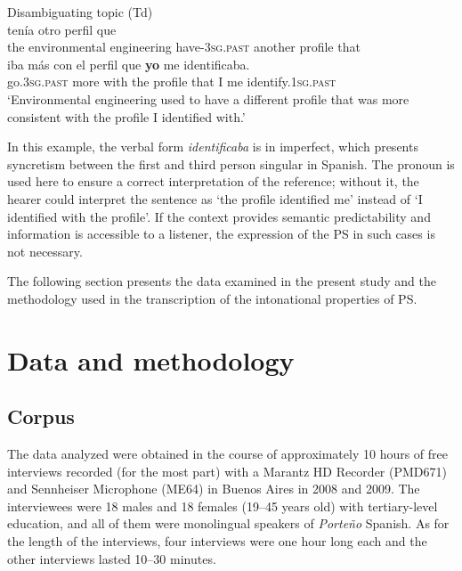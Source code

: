 \documentclass[output=paper]{langsci/langscibook}
\begin{document}
\ea\label{ex:pes:9}
             Disambiguating topic (Td)\\
\gll{} tenía otro perfil    que\\
     the environmental engineering  have-\textsc{3sg}.\textsc{past} another profile  that\\
     
\gll  iba         más  con el perfil    que \textbf{{yo}} me  identificaba.\\
     go.\textsc{3sg}.\textsc{past}  more with the profile  that  I  me  identify.\textsc{1sg}.\textsc{past}\\
\glt ‘Environmental engineering used to have a different profile that was more consistent with the profile I identified with.’
\z

In this example, the verbal form \textit{identificaba} is in imperfect, which presents syncretism between the first and third person singular in Spanish. The pronoun is used here to ensure a correct interpretation of the reference; without it, the hearer could interpret the sentence as ‘the profile identified me’ instead of ‘I identified with the profile’. If the context provides semantic predictability and information is accessible to a listener, the expression of the PS in such cases is not necessary.

The following section presents the data examined in the present study and the methodology used in the transcription of the intonational properties of PS.

\section{Data and methodology}
\label{sec:pes:3}
\subsection{Corpus}
\label{sec:pes:3.1}
The data analyzed were obtained in the course of approximately 10 hours of free interviews recorded (for the most part) with a Marantz HD Recorder (PMD671) and Sennheiser Microphone (ME64) in Buenos Aires in 2008 and 2009. The interviewees were 18 males and 18 females (19–45 years old) with tertiary-level education, and all of them were monolingual speakers of \textit{Porte{\~n}o} Spanish. As for the length of the interviews, four interviews were one hour long each and the other interviews lasted 10–30 minutes.
\end{document}
